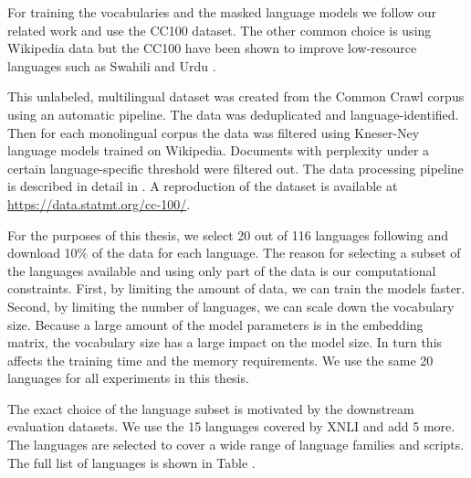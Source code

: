 
For training the vocabularies and the masked language models we follow our related work \cite{conneau_unsupervised_2020,chung_improving_2020,liang_xlm-v_2023} and use the CC100 dataset. The other common choice is using Wikipedia data \cite{devlin_bert_2019,zheng_allocating_2021} but the CC100 have been shown to improve low-resource languages such as Swahili and Urdu \cite{conneau_unsupervised_2020}.

This unlabeled, multilingual dataset was created from the Common Crawl corpus using an automatic pipeline. The data was deduplicated and language-identified. Then for each monolingual corpus the data was filtered using Kneser-Ney language models trained on Wikipedia. Documents with perplexity under a certain language-specific threshold were filtered out. The data processing pipeline is described in detail in \citet{wenzek_ccnet_nodate}. A reproduction of the dataset is available at \url{https://data.statmt.org/cc-100/}.

For the purposes of this thesis, we select 20 out of 116 languages following \citet{limisiewicz_tokenization_2023} and download 10\% of the data for each language. The reason for selecting a subset of the languages available and using only part of the data is our computational constraints. First, by limiting the amount of data, we can train the models faster. Second, by limiting the number of languages, we can scale down the vocabulary size. Because a large amount of the model parameters is in the embedding matrix, the vocabulary size has a large impact on the model size. In turn this affects the training time and the memory requirements. We use the same 20 languages for all experiments in this thesis.

The exact choice of the language subset is motivated by the downstream evaluation datasets. We use the 15 languages covered by XNLI and add 5 more. The languages are selected to cover a wide range of language families and scripts. The full list of languages is shown in Table .


